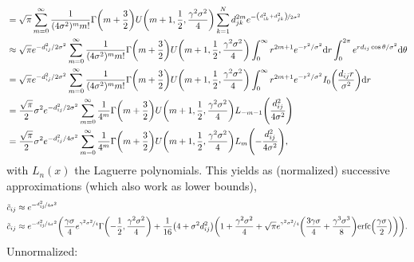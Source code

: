 \documentclass{article}
\begin{document}
\begin{align*}
    &= \sqrt{\pi}\sum_{m=0}^\infty \frac{1}{(4\sigma^2)^{m} m!} \Gamma\qty(m+\frac{3}{2}){}U\qty(m+1, \frac{1}{2}, \frac{\gamma^2\sigma^2}{4})\sum_{k=1}^N d_{jk}^{2m} e^{-\nicefrac{\qty(d_{ik}^2+d_{jk}^2)}{2\sigma^2}}\\
    &\approx \sqrt{\pi}e^{-d_{ij}^2/2\sigma^2}\sum_{m=0}^\infty \frac{1}{(4\sigma^2)^{m} m!} \Gamma\qty(m+\frac{3}{2}){}U\qty(m+1, \frac{1}{2}, \frac{\gamma^2\sigma^2}{4})\int_0^\infty r^{2m+1} e^{-r^2/\sigma^2} \dd r \int_0^{2\pi}  e^{r d_{ij}\cos{\theta}/\sigma^2}\dd\theta\\
    &= \sqrt{\pi}e^{-d_{ij}^2/2\sigma^2}\sum_{m=0}^\infty \frac{1}{(4\sigma^2)^{m} m!} \Gamma\qty(m+\frac{3}{2}){}U\qty(m+1, \frac{1}{2}, \frac{\gamma^2\sigma^2}{4})\int_0^\infty r^{2m+1} e^{-r^2/\sigma^2} I_0\qty(\frac{d_{ij}r}{\sigma^2}) \dd r \\
    &= \frac{\sqrt{\pi}}{2}\sigma^2 e^{-d_{ij}^2/2\sigma^2}\sum_{m=0}^\infty \frac{1}{4^{m}} \Gamma\qty(m+\frac{3}{2})U\qty(m+1, \frac{1}{2}, \frac{\gamma^2\sigma^2}{4})L_{-m-1}\qty(\frac{d_{ij}^2}{4\sigma^2})\\
    &= \frac{\sqrt{\pi}}{2}\sigma^2 e^{-d_{ij}^2/4\sigma^2}\sum_{m=0}^\infty \frac{1}{4^{m}} \Gamma\qty(m+\frac{3}{2})U\qty(m+1, \frac{1}{2}, \frac{\gamma^2\sigma^2}{4})L_{m}\qty(-\frac{d_{ij}^2}{4\sigma^2}),
\end{align*}
with $L_n(x)$ the Laguerre polynomials. This yields as (normalized) successive approximations (which also work as lower bounds),
\begin{align*}
    \Tilde{c}_{ij} &\approx e^{-\nicefrac{d_{ij}^2}{4\sigma^2}}\\
    \Tilde{c}_{ij} &\approx e^{-\nicefrac{d_{ij}^2}{4\sigma^2}}\qty(\frac{\gamma\sigma}{4}e^{\nicefrac{\gamma^2\sigma^2}{4}}\Gamma\qty(-\frac{1}{2}, \frac{\gamma^2\sigma^2}{4}) + \frac{1}{16}\qty(4+\sigma^2d_{ij}^2)\qty(1+\frac{\gamma^2\sigma^2}{4}+\sqrt{\pi}e^{\nicefrac{\gamma^2\sigma^2}{4}}\qty(\frac{3\gamma\sigma}{4}+\frac{\gamma^3\sigma^3}{8})\text{erfc}\qty(\frac{\gamma\sigma}{2}))).
\end{align*}
Unnormalized:
\end{document}
